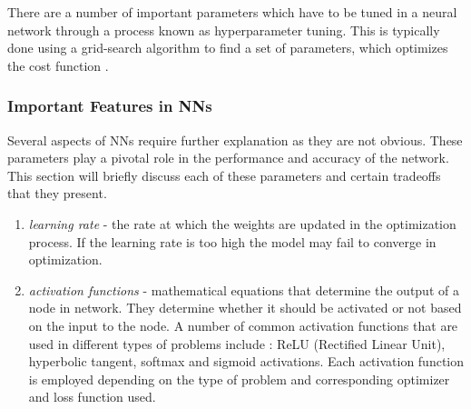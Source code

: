 There are a number of important parameters which have to be tuned in a neural
network through a process known as hyperparameter tuning. This is typically done
using a grid-search algorithm to find a set of parameters, which optimizes the
cost function \cite{LiDL2019}.

\subsubsection{Important Features in \ac{NN}s}
Several aspects of \ac{NN}s require further explanation as they are not obvious.
These parameters play a pivotal role in the performance and accuracy of the
network. This section will briefly discuss each of these parameters and certain
tradeoffs that they present.

\begin{enumerate}
  \item \emph{learning rate} - the rate at which the weights are updated in the
        optimization process. If the learning rate is too high the model may
        fail to converge in optimization.
  \item \emph{activation functions} - mathematical equations that determine the
        output of a node in network. They determine whether it should be
        activated or not based on the input to the node. A number of common
        activation functions that are used in different types of problems
        include : ReLU (Rectified Linear Unit), hyperbolic tangent, softmax
        and sigmoid activations. Each activation function is employed depending
        on the type of problem and corresponding optimizer and loss function
        used.


\end{enumerate}

